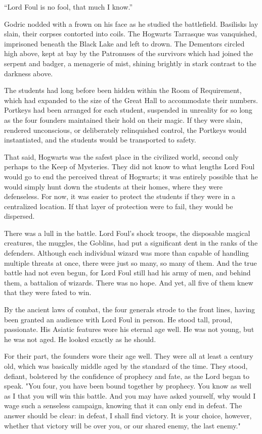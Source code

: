 “Lord Foul is no fool, that much I know.”

Godric nodded with a frown on his face as he studied the battlefield. Basilisks lay slain, their corpses contorted into coils. The Hogwarts Tarrasque was vanquished, imprisoned beneath the Black Lake and left to drown. The Dementors circled high above, kept at bay by the Patronuses of the survivors which had joined the serpent and badger, a menagerie of mist, shining brightly in stark contrast to the darkness above.
\pagebreak

The students had long before been hidden within the Room of Requirement, which had expanded to the size of the Great Hall to accommodate their numbers. Portkeys had been arranged for each student, suspended in unreality for so long as the four founders maintained their hold on their magic. If they were slain, rendered unconscious, or deliberately relinquished control, the Portkeys would instantiated, and the students would be transported to safety.

That said, Hogwarts was the safest place in the civilized world, second only perhaps to the Keep of Mysteries. They did not know to what lengths Lord Foul would go to end the perceived threat of Hogwarts; it was entirely possible that he would simply hunt down the students at their homes, where they were defenseless. For now, it was easier to protect the students if they were in a centralized location. If that layer of protection were to fail, they would be dispersed.

There was a lull in the battle. Lord Foul’s shock troops, the disposable magical creatures, the muggles, the Goblins, had put a significant dent in the ranks of the defenders. Although each individual wizard was more than capable of handling multiple threats at once, there were just so many, so many of them. And the true battle had not even begun, for Lord Foul still had his army of men, and behind them, a battalion of wizards.
\SmallVSpace
There was no hope.
\SmallVSpace
And yet, all five of them knew that they were fated to win.

By the ancient laws of combat, the four generals strode to the front lines, having been granted an audience with Lord Foul in person. He stood tall, proud, passionate. His Asiatic features wore his eternal age well. He was not young, but he was not aged. He looked exactly as he should.

For their part, the founders wore their age well. They were all at least a century old, which was basically middle aged by the standard of the time. They stood, defiant, bolstered by the confidence of prophecy and fate, as the Lord began to speak.
\SomeVSpace
"You four, you have been bound together by prophecy. You know as well as I that you will win this battle. And you may have asked yourself, why would I wage such a senseless campaign, knowing that it can only end in defeat. The answer should be clear: in defeat, I shall find victory. It is your choice, however, whether that victory will be over you, or our shared enemy, the last enemy."

